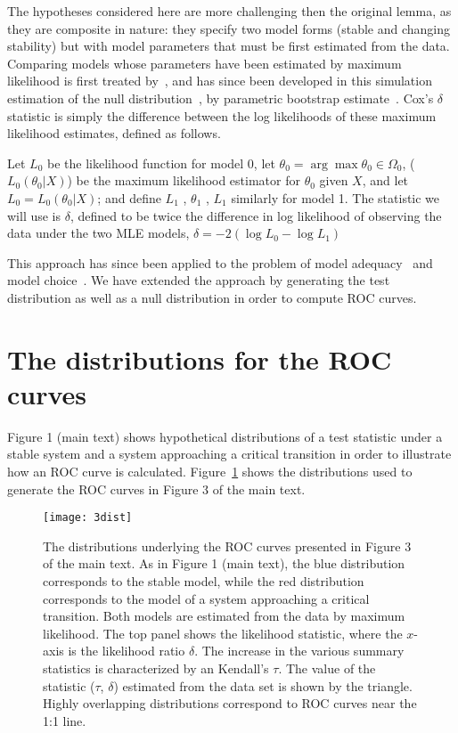 \documentclass[authoryear, preprint,review,12pt]{elsarticle}
\begin{document}
The hypotheses considered here are more challenging then the original lemma, as they are composite in nature:
they specify two model forms (stable and changing stability)
but with model parameters that must be first estimated from the data.
Comparing models whose parameters have been estimated by maximum likelihood is first treated by~\citet{Cox1961, Cox1962},
and has since been developed in this simulation estimation of the null distribution~\citep{McLachlan1987}, by parametric bootstrap estimate~\citep{Efron1987}.  
Cox's $\delta$ statistic is simply the difference between the log likelihoods of these maximum likelihood estimates, defined as follows.

Let $L_0$ be the likelihood function for model 0, let $\theta_0 = \arg \max \theta_0 \in \Omega_0$, ($L_0 (\theta_0 |X)$) be the maximum likelihood estimator for $\theta_0$ given $X$, and let $L_0 = L_0 (\theta_0 |X)$; and define $L_1$ , $\theta_1$ , $L_1$ similarly for model 1. The statistic we will use is $\delta$, defined to be twice the difference in log likelihood of observing the data under the two MLE models,
$\delta = -2 (\log L_0 - \log L_1 )$

This approach has since been applied to the problem of model adequacy~\citep{Goldman1993} and model choice~\citep{Huelsenbeck1996}.  
We have extended the approach by generating the test distribution as well as a null distribution in order to compute ROC curves.  




\pagebreak
\section{The distributions for the ROC curves}
Figure 1 (main text) shows hypothetical distributions of a test statistic under a stable system and a system approaching a critical transition in order to illustrate how an ROC curve is calculated.  Figure~\ref{fig:3dist} shows the distributions used to generate the ROC curves in Figure 3 of the main text.  

\begin{figure}[!ht]
  \begin{center}
    \texttt{[image: 3dist]}
  \end{center}
  \caption{The distributions underlying the ROC curves presented in Figure 3 of the main text.  As in Figure 1 (main text), the blue distribution corresponds to the stable model, while the red distribution corresponds to the model of a system approaching a critical transition.  Both models are estimated from the data by maximum likelihood.  The top panel shows the likelihood statistic, where the $x$-axis is the likelihood ratio $\delta$.  The increase in the various summary statistics is characterized by an Kendall's $\tau$.  The value of the statistic ($\tau$, $\delta$) estimated from the data set is shown by the triangle. Highly overlapping distributions correspond to ROC curves near the 1:1 line.}
  \label{fig:3dist}
\end{figure}
\end{document}
